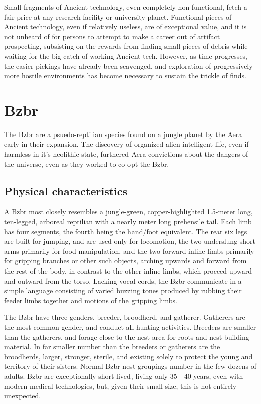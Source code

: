 Small fragments of Ancient technology, even completely non-functional,
fetch a fair price at any research facility or university
planet. Functional pieces of Ancient technology, even if relatively
useless, are of exceptional value, and it is not unheard of for
persons to attempt to make a career out of artifact prospecting,
subsisting on the rewards from finding small pieces of debris while
waiting for the big catch of working Ancient tech. However, as time
progresses, the easier pickings have already been scavenged, and
exploration of progressively more hostile environments has become
necessary to sustain the trickle of finds.

\section{Bzbr}

The Bzbr are a psuedo-reptilian species found on a jungle planet by
the Aera early in their expansion. The discovery of organized alien
intelligent life, even if harmless in it's neolithic state, furthered
Aera convictions about the dangers of the universe, even as they
worked to co-opt the Bzbr.

\subsection{Physical characteristics}
A Bzbr most closely resembles a jungle-green, copper-highlighted
1.5-meter long, ten-legged, arboreal reptilian with a nearly meter
long prehensile tail. Each limb has four segments, the fourth being
the hand/foot equivalent. The rear six legs are built for jumping, and
are used only for locomotion, the two underslung short arms primarily
for food manipulation, and the two forward inline limbs primarily for
gripping branches or other such objects, arching upwards and forward
from the rest of the body, in contrast to the other inline limbs,
which proceed upward and outward from the torso. Lacking vocal cords,
the Bzbr communicate in a simple language consisting of varied buzzing
tones produced by rubbing their feeder limbs together and motions of
the gripping limbs.

The Bzbr have three genders, breeder, broodherd, and
gatherer. Gatherers are the most common gender, and conduct all
hunting activities. Breeders are smaller than the gatherers, and
forage close to the nest area for roots and nest building material. In
far smaller number than the breeders or gatherers are the broodherds,
larger, stronger, sterile, and existing solely to protect the young
and territory of their sisters. Normal Bzbr nest groupings number in
the few dozens of adults. Bzbr are exceptionally short lived, living
only 35 - 40 years, even with modern medical technologies, but, given
their small size, this is not entirely unexpected.

